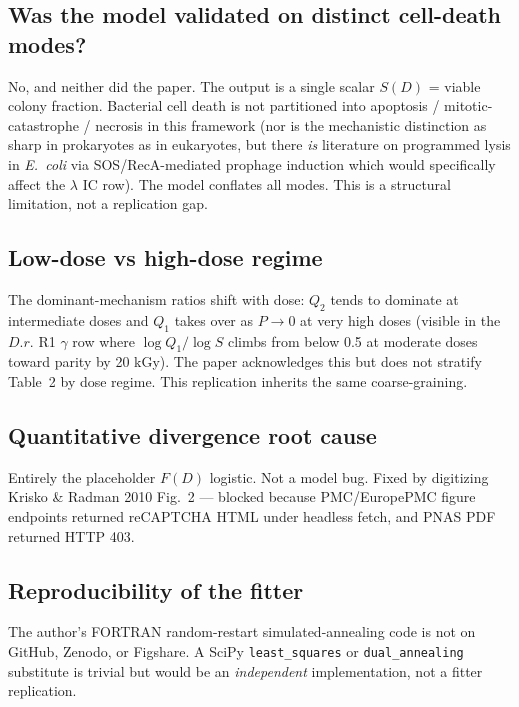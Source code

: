 \documentclass[11pt]{article}
\begin{document}
\subsection*{Was the model validated on distinct cell-death modes?}
No, and neither did the paper. The output is a single scalar $S(D)$ = viable colony fraction.
Bacterial cell death is not partitioned into apoptosis / mitotic-catastrophe / necrosis in
this framework (nor is the mechanistic distinction as sharp in prokaryotes as in eukaryotes,
but there \emph{is} literature on programmed lysis in \textit{E.~coli} via SOS/RecA-mediated
prophage induction which would specifically affect the $\lambda$ IC row). The model conflates
all modes. This is a structural limitation, not a replication gap.

\subsection*{Low-dose vs high-dose regime}
The dominant-mechanism ratios shift with dose: $Q_2$ tends to dominate at intermediate doses
and $Q_1$ takes over as $P \to 0$ at very high doses (visible in the $D.r.$ R1 $\gamma$ row
where $\log Q_1 / \log S$ climbs from below 0.5 at moderate doses toward parity by 20 kGy).
The paper acknowledges this but does not stratify Table~2 by dose regime. This replication
inherits the same coarse-graining.

\subsection*{Quantitative divergence root cause}
Entirely the placeholder $F(D)$ logistic. Not a model bug. Fixed by digitizing Krisko \&
Radman 2010 Fig.~2 --- blocked because PMC/EuropePMC figure endpoints returned reCAPTCHA HTML
under headless fetch, and PNAS PDF returned HTTP 403.

\subsection*{Reproducibility of the fitter}
The author's FORTRAN random-restart simulated-annealing code is not on GitHub, Zenodo, or
Figshare. A SciPy \texttt{least\_squares} or \texttt{dual\_annealing} substitute is trivial
but would be an \emph{independent} implementation, not a fitter replication.
\end{document}
